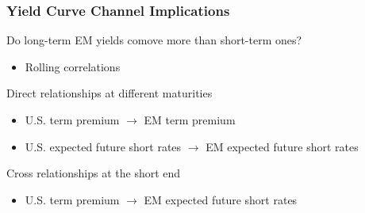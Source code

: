 \documentclass[12pt, aspectratio=169, xcolor=dvipsnames]{beamer}
\begin{document}
\begin{frame}
\frametitle{Yield Curve Channel Implications}

Do long-term EM yields \alert{comove} more than short-term ones?
\begin{itemize}
\item Rolling correlations %
\end{itemize}

\alert{Direct} relationships at different maturities
\begin{itemize}
\item U.S. term premium \(\rightarrow\) EM term premium
\item U.S. expected future short rates \(\rightarrow\) EM expected future short rates
\end{itemize}

\alert{Cross} relationships at the short end
\begin{itemize}
\item U.S. term premium \(\rightarrow\) EM expected future short rates
\end{itemize}

\end{frame}

\end{document}

